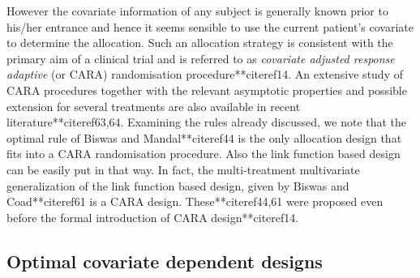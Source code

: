 However the covariate information of any subject is generally known prior to his/her entrance and hence it seems sensible to use the current patient's covariate to determine the allocation. Such an allocation strategy is consistent with the primary aim of a clinical trial and is referred to as \textit{covariate adjusted response adaptive} (or CARA) randomisation procedure**citeref{14}. An extensive study of CARA procedures together with the relevant asymptotic properties and possible extension for several treatments are also available in recent literature**citeref{63,64}. Examining the rules already discussed, we note that the optimal rule of Biswas and Mandal**citeref{44} is the only allocation design that fits into a CARA randomisation procedure. Also the link function based design can be easily put in that way. In fact, the multi-treatment multivariate generalization of the link function based design, given by Biswas and Coad**citeref{61} is a CARA design. These**citeref{44,61} were proposed even before the formal introduction of CARA design**citeref{14}.


\subsection{Optimal covariate dependent designs}

